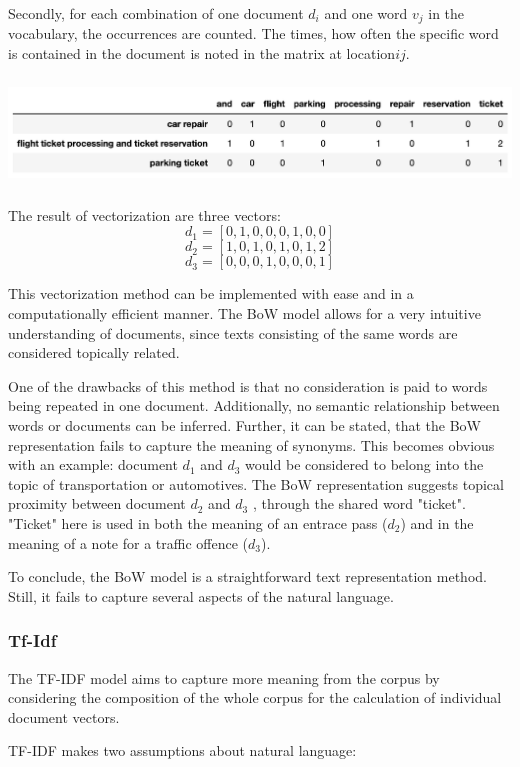 		Secondly, for each combination of one document $ d_{i} $ and one word $ v_{j} $ in the vocabulary, the occurrences are counted. The times, how often the specific word is contained in the document is noted in the matrix at location$  ij $.
		
		\includegraphics[height=2.9cm]{Bilder/bow.png}

		The result of vectorization are three vectors:
		\[ d_{1} = [0,1,0,0,0,1,0,0] \]
		\[ d_{2} = [1,0,1,0,1,0,1,2] \]	
		\[ d_{3} = [0,0,0,1,0,0,0,1]\]


		This vectorization method can be implemented with ease and in a computationally efficient manner. The \ac{BoW} model allows for a very intuitive understanding of documents, since texts consisting of the same words are considered topically related. 
		
		One of the drawbacks of this method is that no consideration is paid to words being repeated in one document. Additionally, no semantic relationship between words or documents can be inferred. 
		Further, it can be stated, that the \ac{BoW} representation fails to capture the meaning of synonyms. This becomes obvious with an example: document $ d_{1} $ and $ d_{3}$ would be considered to belong into the topic of transportation or automotives. The \ac{BoW} representation suggests topical proximity between document $ d_{2} $ and $ d_{3}$ , through the shared word "ticket". "Ticket" here is used in both the meaning of an entrace pass ($d_{2}$) and in the meaning of a note for a traffic offence  ($d_{3}$). 
		
		To conclude, the \ac{BoW} model is a straightforward text representation method. Still, it fails to capture several aspects of the natural language.
		
		\subsubsection{Tf-Idf}
		The \ac{TF-IDF} model aims to capture more meaning from the corpus by considering the composition of the whole corpus for the calculation of individual document vectors.
		
		\ac{TF-IDF} makes two assumptions about natural language:
		
